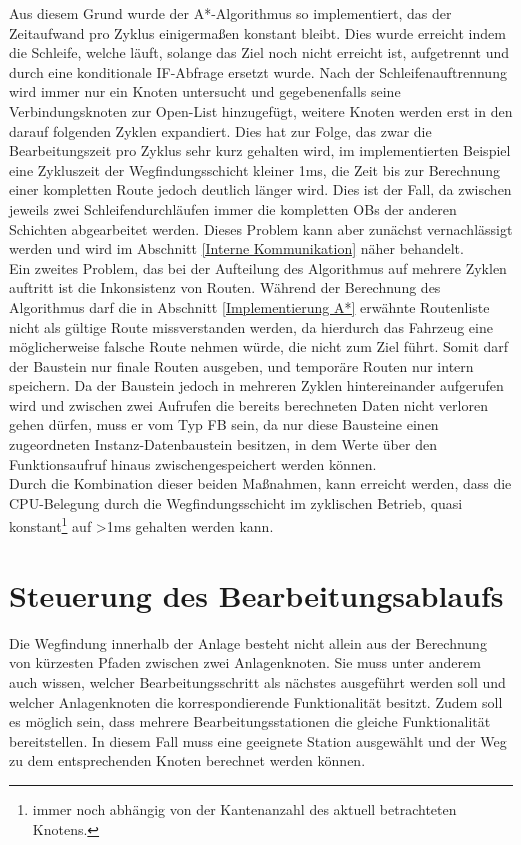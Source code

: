 			Aus diesem Grund wurde der A*-Algorithmus so implementiert, das der Zeitaufwand pro Zyklus einigermaßen konstant bleibt. Dies wurde erreicht indem die Schleife, welche läuft, solange das Ziel noch nicht erreicht ist, aufgetrennt und durch eine konditionale IF-Abfrage ersetzt wurde. Nach der Schleifenauftrennung wird immer nur ein Knoten untersucht und gegebenenfalls seine Verbindungsknoten zur Open-List hinzugefügt, weitere Knoten werden erst in den darauf folgenden Zyklen expandiert. Dies hat zur Folge, das zwar die Bearbeitungszeit pro Zyklus sehr kurz gehalten wird, im implementierten Beispiel eine Zykluszeit der Wegfindungsschicht kleiner 1ms, die Zeit bis zur Berechnung einer kompletten Route jedoch deutlich länger wird. Dies  ist der Fall, da zwischen jeweils zwei Schleifendurchläufen immer die kompletten \ac{OB}s der anderen Schichten abgearbeitet werden. Dieses Problem kann aber zunächst vernachlässigt werden und wird im Abschnitt \ref{Interne Kommunikation} näher behandelt.\\
			
			Ein zweites Problem, das bei der Aufteilung des Algorithmus auf mehrere Zyklen auftritt ist die Inkonsistenz von Routen. Während der Berechnung des Algorithmus darf die in Abschnitt \ref{Implementierung A*} erwähnte Routenliste nicht als gültige Route missverstanden werden, da hierdurch das Fahrzeug eine möglicherweise falsche Route nehmen würde, die nicht zum Ziel führt. Somit darf der Baustein nur finale Routen ausgeben, und temporäre Routen nur intern speichern. Da der Baustein jedoch in mehreren Zyklen hintereinander aufgerufen wird und zwischen zwei Aufrufen die bereits berechneten Daten nicht verloren gehen dürfen, muss er vom Typ \ac{FB} sein, da nur diese Bausteine einen zugeordneten Instanz-Datenbaustein besitzen, in dem Werte über den Funktionsaufruf hinaus zwischengespeichert werden können.\\
			Durch die Kombination dieser beiden Maßnahmen, kann erreicht werden, dass die CPU-Belegung durch die Wegfindungsschicht im zyklischen Betrieb, quasi konstant\footnote{immer noch abhängig von der Kantenanzahl des aktuell betrachteten Knotens. } auf >1ms gehalten werden kann.
		
	\section{Steuerung des Bearbeitungsablaufs}
		
		Die Wegfindung innerhalb der Anlage besteht nicht allein aus der Berechnung von kürzesten Pfaden zwischen zwei Anlagenknoten. Sie muss unter anderem auch wissen, welcher Bearbeitungsschritt als nächstes ausgeführt werden soll und welcher Anlagenknoten die korrespondierende Funktionalität besitzt. Zudem soll es möglich sein, dass mehrere Bearbeitungsstationen die gleiche Funktionalität bereitstellen. In diesem Fall muss eine geeignete Station ausgewählt und der Weg zu dem entsprechenden Knoten berechnet werden können.
	
